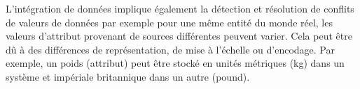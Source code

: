 \documentclass[12pt,a4paper,oneside]{book}
\begin{document}
    L’intégration de données implique également la
    détection et résolution de conflits de valeurs de données
    par exemple pour une même entité du monde réel, les valeurs d'attribut provenant de sources différentes peuvent varier.
     Cela peut être dû à des différences de représentation, de mise à l'échelle ou d'encodage. Par exemple, un  poids (attribut) peut être stocké en unités métriques (kg) dans un système et impériale britannique  dans un autre (pound).
   
    
\end{document}
